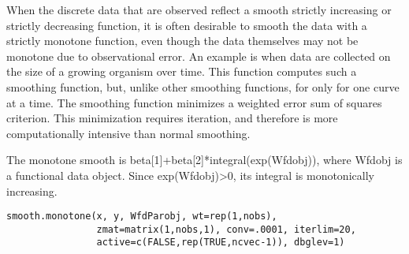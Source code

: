 \documentclass{article}
\begin{document}
\begin{Description}\relax
When the discrete data that are observed reflect a smooth strictly
increasing or strictly decreasing function, it is often desirable to
smooth the data with a strictly monotone function, even though the
data themselves may not be monotone due to observational error.  An
example is when data are collected on the size of a growing organism
over time.  This function computes such a smoothing function, but,
unlike other smoothing functions, for only for one curve at a time.
The smoothing function minimizes a weighted error sum of squares
criterion.  This minimization requires iteration, and therefore is
more computationally intensive than normal smoothing.

The monotone smooth is beta[1]+beta[2]*integral(exp(Wfdobj)), where
Wfdobj is a functional data object.  Since exp(Wfdobj)>0, its integral
is monotonically increasing.
\end{Description}
\begin{Usage}
\begin{verbatim}
smooth.monotone(x, y, WfdParobj, wt=rep(1,nobs),
                zmat=matrix(1,nobs,1), conv=.0001, iterlim=20,
                active=c(FALSE,rep(TRUE,ncvec-1)), dbglev=1)
\end{verbatim}
\end{Usage}
\end{document}
